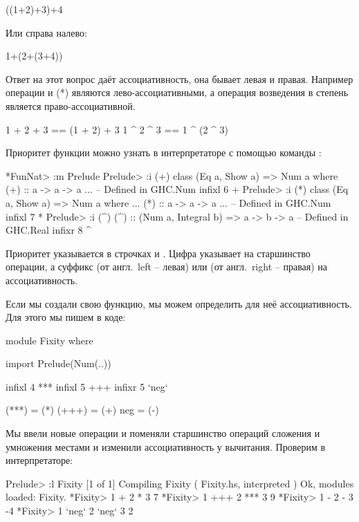 \begin{code}
((1+2)+3)+4
\end{code}

Или справа налево:

\begin{code}
1+(2+(3+4))
\end{code}

Ответ на этот вопрос даёт ассоциативность, она бывает левая и
правая. Например операции \In{(+)} \In{(-)} и (*) являются лево-ассоциативными,
а операция возведения в степень \In{(^)} является право-ассоциативной.

\begin{code}
1 + 2 + 3 == (1 + 2) + 3
1 ^ 2 ^ 3 ==  1 ^ (2 ^ 3)
\end{code}


Приоритет функции можно узнать в интерпретаторе с помощью
команды :

\begin{code}
*FunNat> :m Prelude
Prelude> :i (+)
class (Eq a, Show a) => Num a where
  (+) :: a -> a -> a
  ...
  	-- Defined in GHC.Num
infixl 6 +
Prelude> :i (*)
class (Eq a, Show a) => Num a where
  ...
  (*) :: a -> a -> a
  ...
  	-- Defined in GHC.Num
infixl 7 *
Prelude> :i (^)
(^) :: (Num a, Integral b) => a -> b -> a 	-- Defined in GHC.Real
infixr 8 ^
\end{code}

Приоритет указывается в строчках  и .
Цифра указывает на старшинство операции, а суффикс  
(от англ.~left -- левая) или  (от англ.~right -- правая)
на ассоциативность. 

Если мы создали свою функцию, мы можем определить для 
неё ассоциативность. Для этого мы пишем в коде:

\begin{code}
module Fixity where

import Prelude(Num(..))

infixl 4 *** 
infixl 5 +++
infixr 5 `neg`

(***) = (*)
(+++) = (+)
neg   = (-)
\end{code}

Мы ввели новые операции и поменяли старшинство операций
сложения и умножения местами и изменили ассоциативность 
у вычитания. Проверим в интерпретаторе:

\begin{code}
Prelude> :l Fixity
[1 of 1] Compiling Fixity           ( Fixity.hs, interpreted )
Ok, modules loaded: Fixity.
*Fixity> 1 + 2 * 3
7
*Fixity> 1 +++ 2 *** 3
9
*Fixity> 1 - 2 - 3
-4
*Fixity> 1 `neg` 2 `neg` 3
2
\end{code}

